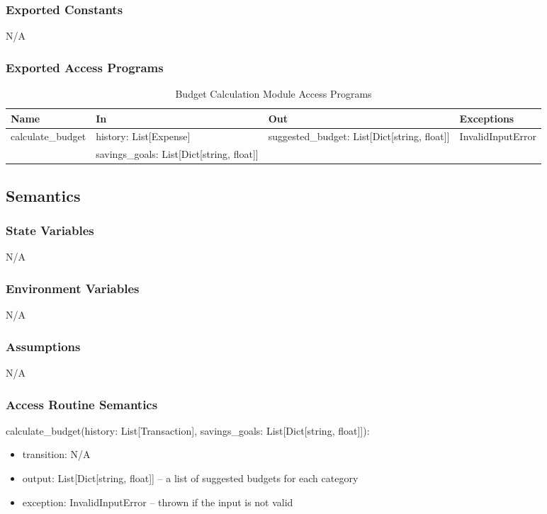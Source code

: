 \documentclass[12pt, titlepage]{article}
\begin{document}
\subsubsection{Exported Constants}
N/A

\subsubsection{Exported Access Programs}

\begin{center}
\begin{table}[H]
  \caption{Budget Calculation Module Access Programs}
\begin{tabular}{p{4cm} p{4cm} p{4cm} p{4cm}}
\hline
\textbf{Name} & \textbf{In} & \textbf{Out} & \textbf{Exceptions} \\
\hline
calculate\_budget & history: List[Expense] & suggested\_budget: List[Dict[string, float]]
& InvalidInputError \\
& savings\_goals: List[Dict[string, float]] & &  \\
\hline
\end{tabular}
\end{table}
\end{center}

\subsection{Semantics}

\subsubsection{State Variables}
N/A

\subsubsection{Environment Variables}
N/A

\subsubsection{Assumptions}
N/A

\subsubsection{Access Routine Semantics}

\noindent calculate\_budget(history: List[Transaction], savings\_goals: List[Dict[string, float]]):
\begin{itemize}
\item transition: N/A
\item output: List[Dict[string, float]] -- a list of suggested budgets for each category
\item exception: InvalidInputError -- thrown if the input is not valid
\end{itemize}
\end{document}
